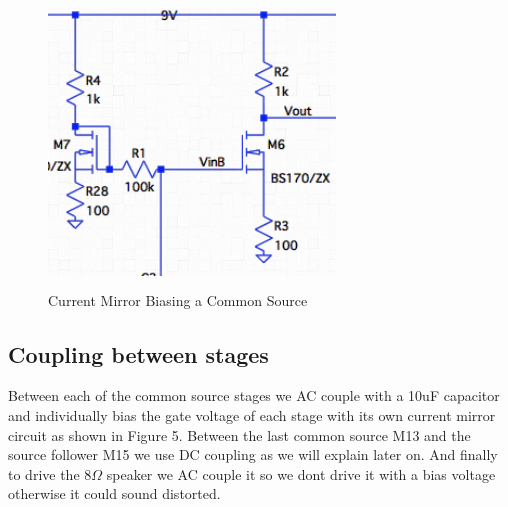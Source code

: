 \documentclass[11pt, twoside, letterpaper]{article}
\begin{document}
\begin{figure}[htbp]
\begin{center}
\includegraphics[width=3in,height=3in]{CurrentMirror.png}
\caption{Current Mirror Biasing a Common Source}
\end{center}
\end{figure}
\FloatBarrier

\subsection{Coupling between stages}

Between each of the common source stages we AC couple with a 10uF capacitor and individually bias the gate voltage of each stage with its own current 
mirror circuit as shown in Figure 5. Between the last common source M13 and the source follower M15 we use DC coupling as we will explain later on. 
And finally to drive the $8\Omega$ speaker we AC couple it so we dont drive it with a bias voltage otherwise it could sound distorted.
\end{document}
